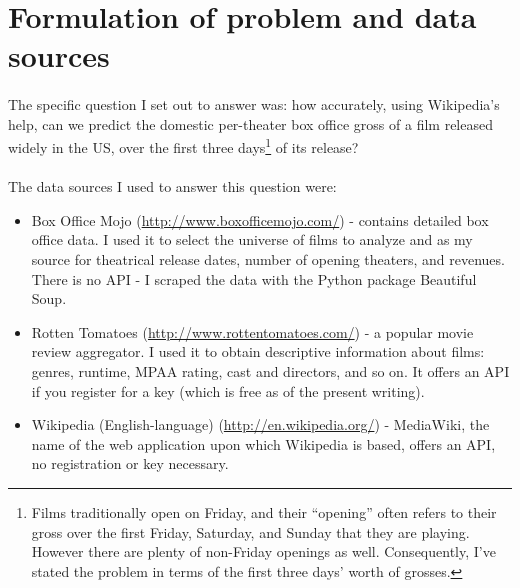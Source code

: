 \documentclass[10pt]{article}
\begin{document}
    \section{Formulation of problem and data sources}
    
    \paragraph{}
    The specific question I set out to answer was: how accurately, using Wikipedia's help, can we predict the domestic per-theater box office gross of a film released widely in the US, over the first three days\footnote{Films traditionally open on Friday, and their ``opening'' often refers to their gross over the first Friday, Saturday, and Sunday that they are playing. However there are plenty of non-Friday openings as well. Consequently, I've stated the problem in terms of the first three days' worth of grosses.} of its release? 
    
    \paragraph{}
    The data sources I used to answer this question were: 
    
    \begin{itemize}
        \item Box Office Mojo (\url{http://www.boxofficemojo.com/}) - contains detailed box office data. I used it to select the universe of films to analyze and as my source for theatrical release dates, number of opening theaters, and revenues. There is no API - I scraped the data with the Python package \textsf{Beautiful Soup}. 
        \item Rotten Tomatoes (\url{http://www.rottentomatoes.com/}) - a popular movie review aggregator. I used it to obtain descriptive information about films: genres, runtime, MPAA rating, cast and directors, and so on. It offers an API if you register for a key (which is free as of the present writing). 
        \item Wikipedia (English-language) (\url{http://en.wikipedia.org/}) - MediaWiki, the name of the web application upon which Wikipedia is based, offers an API, no registration or key necessary. 
    \end{itemize}
    
\end{document}
